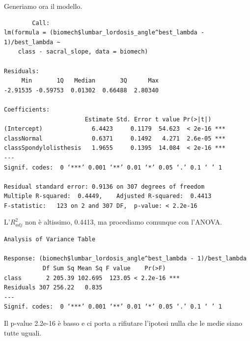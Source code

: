 \documentclass{beamer}
\begin{document}
\begin{frame}[fragile]
	Generiamo ora il modello.
	{\tiny
	\begin{verbatim}
		Call:
lm(formula = (biomech$lumbar_lordosis_angle^best_lambda - 1)/best_lambda ~ 
    class - sacral_slope, data = biomech)

Residuals:
     Min       1Q   Median       3Q      Max 
-2.91535 -0.59753  0.01302  0.66488  2.80340 

Coefficients:
                       Estimate Std. Error t value Pr(>|t|)    
(Intercept)              6.4423     0.1179  54.623  < 2e-16 ***
classNormal              0.6371     0.1492   4.271  2.6e-05 ***
classSpondylolisthesis   1.9655     0.1395  14.084  < 2e-16 ***
---
Signif. codes:  0 ‘***’ 0.001 ‘**’ 0.01 ‘*’ 0.05 ‘.’ 0.1 ‘ ’ 1

Residual standard error: 0.9136 on 307 degrees of freedom
Multiple R-squared:  0.4449,	Adjusted R-squared:  0.4413 
F-statistic:   123 on 2 and 307 DF,  p-value: < 2.2e-16
	\end{verbatim}
	}
\end{frame}

\begin{frame}[fragile]
	L'$R^{2}_{adj}$ non è altissimo, 0.4413, ma procediamo comunque con l'ANOVA.

	{\tiny
	\begin{verbatim}
Analysis of Variance Table

Response: (biomech$lumbar_lordosis_angle^best_lambda - 1)/best_lambda
           Df Sum Sq Mean Sq F value    Pr(>F)    
class       2 205.39 102.695  123.05 < 2.2e-16 ***
Residuals 307 256.22   0.835                      
---
Signif. codes:  0 ‘***’ 0.001 ‘**’ 0.01 ‘*’ 0.05 ‘.’ 0.1 ‘ ’ 1
	\end{verbatim}
	}

	Il p-value 2.2e-16 è basso e ci porta a rifiutare l'ipotesi nulla che le medie siano tutte uguali.
\end{frame}






%
%
%
%
\end{document}
